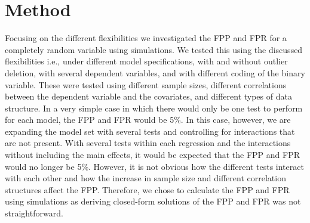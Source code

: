\section{Method}
Focusing on the different flexibilities we investigated the FPP and FPR for a completely random variable using simulations. We tested this using the discussed flexibilities i.e., under different model specifications, with and without outlier deletion, with several dependent variables, and with different coding of the binary variable. These were tested using different sample sizes, different correlations between the dependent variable and the covariates, and different types of data structure. In a very simple case in which there would only be one test to perform for each model, the FPP and FPR would be 5\%. In this case, however, we are expanding the model set with several tests and controlling for interactions that are not present. With several tests within each regression and the interactions without including the main effects, it would be expected that the FPP and FPR would no longer be 5\%. However, it is not obvious how the different tests interact with each other and how the increase in sample size and different correlation structures affect the FPP. Therefore, we chose to calculate the FPP and FPR using simulations as deriving closed-form solutions of the FPP and FPR was not straightforward.\\
